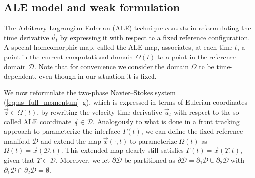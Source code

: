 \documentclass[a4paper,12pt,onecolumn]{article}
\newcommand{\D}{\mathcal D}
\begin{document}
\subsection{ALE model and weak formulation} \label{sec:ale_model}
The Arbitrary Lagrangian Eulerian (ALE) technique consists in
reformulating the time derivative $\vec u_t$ by expressing it with respect to a
fixed reference configuration. A special homeomorphic map, called the ALE map,
associates, at each time $t$, a point in the current computational domain
$\Omega(t)$ to a point in the reference domain $\D$. Note that for convenience
we consider the domain $\Omega$ to be time-dependent, even though in our
situation it is fixed.

We now reformulate the two-phase Navier--Stokes system
(\ref{eq:ns_full_momentum}--g), which is expressed in terms of Eulerian
coordinates $\vec z\in\Omega(t)$, by rewriting the velocity time derivative
$\vec u_t$ with respect to the so called ALE coordinate $\vec q \in \D$.
Analogously to what is done in a front tracking approach to parameterize the
interface $\Gamma(t)$, we can define the fixed reference manifold $\D$ and
extend the map $\vec x(\cdot,t)$ to parameterize $\Omega(t)$ as
$\Omega(t)=\vec x(\D,t)$. This extended map clearly still satisfies $\Gamma(t)
= \vec x(\Upsilon,t)$, given that $\Upsilon\subset\D$. Moreover, we let
$\partial\D$ be partitioned as $\partial\D=\partial_1\D \cup \partial_2\D$
with $\partial_1\D \cap \partial_2\D = \emptyset$.
\end{document}
